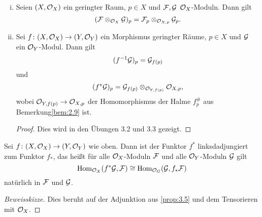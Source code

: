 \begin{lem}
	\begin{enumerate}[i)]
		\item Seien $(X,\mathcal{O}_X)$ ein geringter Raum, $p\in X$ und $\mathcal{F},\mathcal{G}$ $\mathcal{O}_X$-Moduln. Dann gilt
		\[
			(\mathcal{F}\otimes_{\mathcal{O}_X}\mathcal{G})_p = \mathcal{F}_p \otimes_{\mathcal{O}_{X,p}} \mathcal{G}_p.
		\]
		\item Sei $f \colon (X, \mathcal{O}_X) \to (Y, \mathcal{O}_Y)$ ein Morphismus geringter Räume, $p \in X$ und $\mathcal{G}$ ein $\mathcal{O}_Y$-Modul. Dann gilt
		\[
			(f^{-1}\mathcal{G})_p = \mathcal{G}_{f(p)}
		\]
		und
		\[
			(f^*\mathcal{G})_p = \mathcal{G}_{f(p)}\otimes_{\mathcal{O}_{Y,f(p)}}\mathcal{O}_{X,p},
		\]
		wobei $\mathcal{O}_{Y,f(p)}\to \mathcal{O}_{X,p}$ der Homomorphismus der Halme $f^{\#}_p$ aus Bemerkung\ref{bem:2.9} ist.
		\begin{proof}
			Dies wird in den Übungen 3.2 und 3.3 gezeigt.
		\end{proof}
	\end{enumerate}
\end{lem}

\begin{lem}
	Sei $f\colon (X,\mathcal{O}_X) \to (Y,\mathcal{O}_Y)$ wie oben. Dann ist der Funktor $f^*$ linksdadjungiert zum Funktor $f_*$, das heißt für alle $\mathcal{O}_X$-Moduln $\mathcal{F}$ und alle $\mathcal{O}_Y$-Moduln $\mathcal{G}$ gilt
	\[
		\operatorname{Hom}_{\mathcal{O}_X}(f^*\mathcal{G},\mathcal{F}) \cong \operatorname{Hom}_{\mathcal{O}_G}(\mathcal{G},f_*\mathcal{F})
	\]
	natürlich in $\mathcal{F}$ und $\mathcal{G}$.
	\begin{proof}[Beweisskizze]
		Dies beruht auf der Adjunktion aus \ref{prop:3.5} und dem Tensorieren mit $\mathcal{O}_X$.
	\end{proof}
\end{lem}